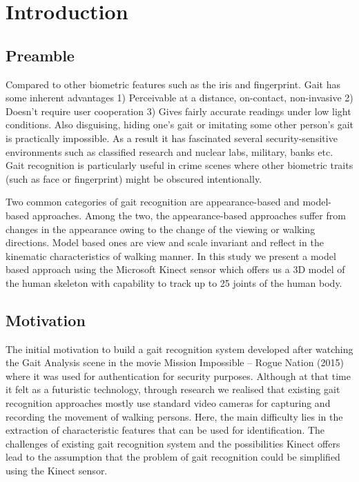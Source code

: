 \chapter{Introduction} \label{Introduction}
\section{Preamble} \label{Preamble}
\noindent Compared to other biometric features such as the iris and fingerprint. Gait has some inherent advantages
1) Perceivable at a distance, on-contact, non-invasive
2) Doesn’t require user cooperation
3) Gives fairly accurate readings under low light conditions.
Also disguising, hiding one’s gait or imitating some other person’s gait is practically impossible. As a result it has fascinated several security-sensitive environments such as classified research and nuclear labs, military, banks etc. Gait recognition is particularly useful in crime scenes where other biometric traits (such as face or fingerprint) might be obscured intentionally.

\noindent Two common categories of gait recognition are appearance-based and model-based approaches. Among the two, the appearance-based approaches suffer from changes in the appearance owing to the change of the viewing or walking directions. Model based ones are view and scale invariant and reflect in the kinematic characteristics of walking manner.
In this study we present a model based approach using the Microsoft Kinect sensor which offers us a 3D model of the human skeleton with capability to track up to 25 joints of the human body.
\section{Motivation}\label{Motivation}
\noindent The initial motivation to build a gait recognition system developed after watching the Gait Analysis scene in the movie Mission Impossible – Rogue Nation (2015) where it was used for authentication for security purposes. Although at that time it felt as a futuristic technology, through research we realised that existing gait recognition approaches mostly use standard video cameras for capturing and recording the movement of walking persons. Here, the main difficulty lies in the extraction of characteristic features that can be used for identification. The challenges of existing gait recognition system and the possibilities Kinect offers lead to the assumption that the problem of gait recognition could be simplified using the Kinect sensor.

